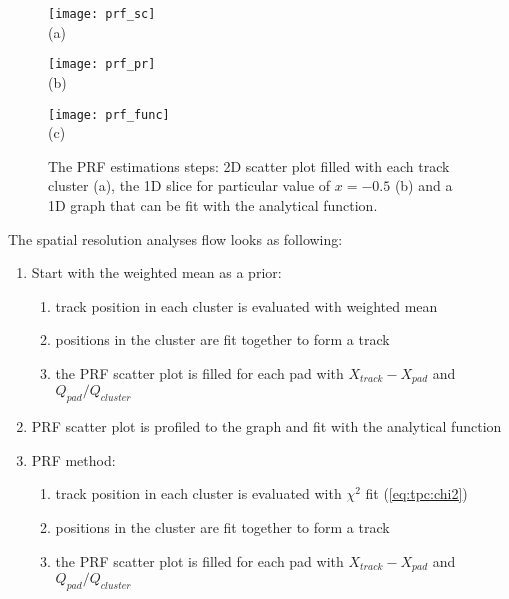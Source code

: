\documentclass[../main.tex]{subfiles}
\begin{document}
\begin{figure}[!ht]
  \centering
  \begin{minipage}{0.33\linewidth}
    \centering
    \texttt{[image: prf\_sc]} \\ (a)
  \end{minipage}
  \begin{minipage}{0.33\linewidth}
    \centering
    \texttt{[image: prf\_pr]} \\ (b)
  \end{minipage}
  \begin{minipage}{0.33\linewidth}
    \centering
    \texttt{[image: prf\_func]} \\ (c)
  \end{minipage}
  \caption{The PRF estimations steps: 2D scatter plot filled with each track cluster (a), the 1D slice for particular value of $x=-0.5$ (b) and a 1D graph that can be fit with the analytical function.}
  \label{fig:tpc:prf}
\end{figure}

The spatial resolution analyses flow looks as following:
\begin{enumerate}
  \item Start with the weighted mean as a prior:
  \begin{enumerate}
    \item track position in each cluster is evaluated with weighted mean
    \item positions in the cluster are fit together to form a track
    \item the PRF scatter plot is filled for each pad with $X_{track} - X_{pad}$ and $Q_{pad}/Q_{cluster}$
  \end{enumerate}
  \item PRF scatter plot is profiled to the graph and fit with the analytical function
  \item PRF method:
  \begin{enumerate}
    \item track position in each cluster is evaluated with $\chi^2$ fit (\autoref{eq:tpc:chi2})
    \item positions in the cluster are fit together to form a track
    \item the PRF scatter plot is filled for each pad with $X_{track} - X_{pad}$ and $Q_{pad}/Q_{cluster}$
  \end{enumerate}
\end{enumerate}
\end{document}
